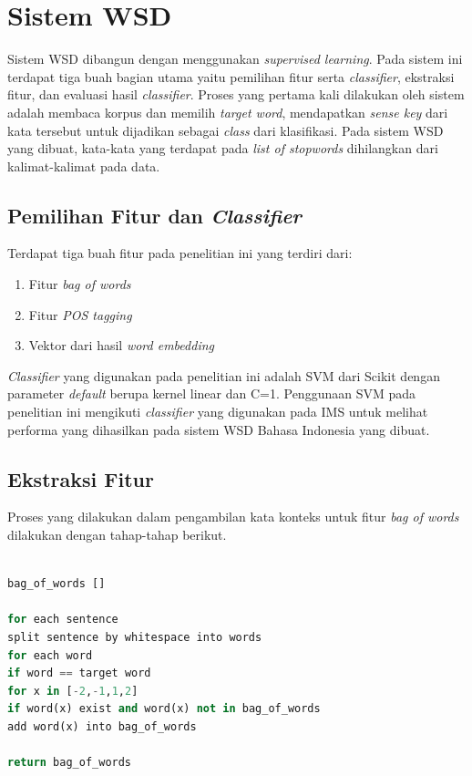 \section{Sistem WSD}
Sistem WSD dibangun dengan menggunakan \textit{supervised learning}. Pada sistem ini terdapat tiga buah bagian utama yaitu pemilihan fitur serta \textit{classifier}, ekstraksi fitur, dan evaluasi hasil \textit{classifier}. Proses yang pertama kali dilakukan oleh sistem adalah membaca korpus dan memilih \textit{target word}, mendapatkan \textit{sense key} dari kata tersebut untuk dijadikan sebagai \textit{class} dari klasifikasi. Pada sistem WSD yang dibuat, kata-kata yang terdapat pada \textit{list of stopwords} dihilangkan dari kalimat-kalimat pada data.

\subsection{Pemilihan Fitur dan \textit{Classifier}}
Terdapat tiga buah fitur pada penelitian ini yang terdiri dari:

\begin{enumerate}
	\item Fitur \textit{bag of words}
	\item Fitur \textit{POS tagging}
	\item Vektor dari hasil \textit{word embedding}
\end{enumerate}

\textit{Classifier} yang digunakan pada penelitian ini adalah SVM dari Scikit \citep{scikit-learn} dengan parameter \textit{default} berupa kernel linear dan C=1. Penggunaan SVM pada penelitian ini mengikuti \textit{classifier} yang digunakan pada IMS \cite{zhong2010makes} untuk melihat performa yang dihasilkan pada sistem WSD Bahasa Indonesia yang dibuat.

\subsection{Ekstraksi Fitur}
Proses yang dilakukan dalam pengambilan kata konteks untuk fitur \textit{bag of words} dilakukan dengan tahap-tahap berikut.

\begin{lstlisting}[language=python,caption={Fitur Bag of Words}, label={fitur-bag-of-words}]

bag_of_words []

for each sentence
split sentence by whitespace into words
for each word
if word == target word
for x in [-2,-1,1,2]
if word(x) exist and word(x) not in bag_of_words
add word(x) into bag_of_words

return bag_of_words

\end{lstlisting}

